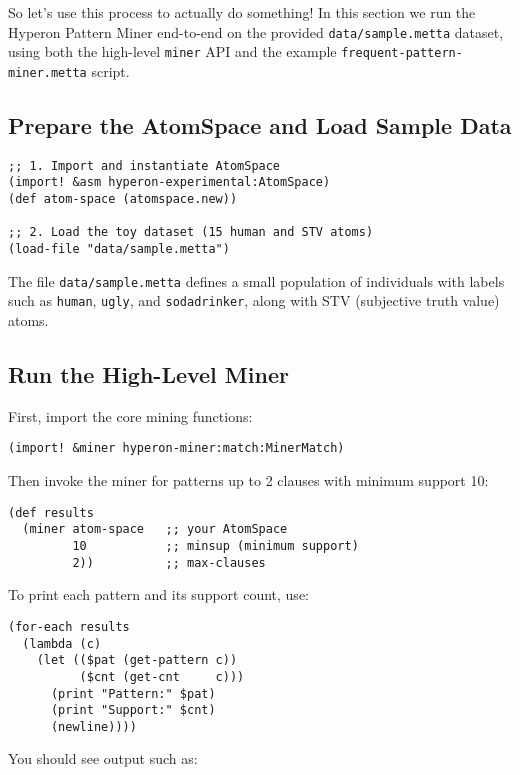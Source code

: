 \documentclass{article}
\begin{document}
So let's use this process to actually do something!  In this section we run the Hyperon Pattern Miner end-to-end on the provided \texttt{data/sample.metta} dataset, using both the high-level \texttt{miner} API and the example \texttt{frequent-pattern-miner.metta} script.

\subsection{Prepare the AtomSpace and Load Sample Data}

\begin{verbatim}
;; 1. Import and instantiate AtomSpace
(import! &asm hyperon-experimental:AtomSpace)
(def atom-space (atomspace.new))

;; 2. Load the toy dataset (15 human and STV atoms)
(load-file "data/sample.metta")
\end{verbatim}

The file \texttt{data/sample.metta} defines a small population of individuals with labels such as \texttt{human}, \texttt{ugly}, and \texttt{sodadrinker}, along with STV (subjective truth value) atoms.

\subsection{Run the High-Level Miner}

First, import the core mining functions:

\begin{verbatim}
(import! &miner hyperon-miner:match:MinerMatch)
\end{verbatim}

Then invoke the miner for patterns up to 2 clauses with minimum support 10:

\begin{verbatim}
(def results
  (miner atom-space   ;; your AtomSpace
         10           ;; minsup (minimum support)
         2))          ;; max-clauses
\end{verbatim}

To print each pattern and its support count, use:

\begin{verbatim}
(for-each results
  (lambda (c)
    (let (($pat (get-pattern c))
          ($cnt (get-cnt     c)))
      (print "Pattern:" $pat)
      (print "Support:" $cnt)
      (newline))))
\end{verbatim}

You should see output such as:
\end{document}
